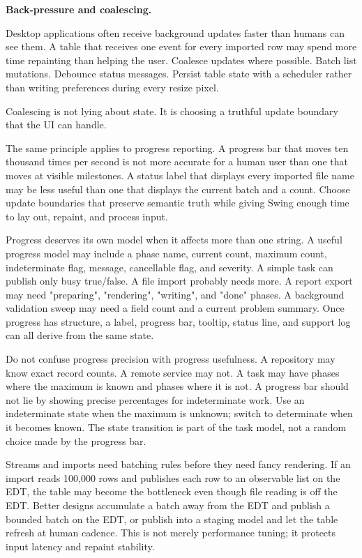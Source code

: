 \textbf{Back-pressure and coalescing.}

Desktop applications often receive background updates faster than humans can
see them. A table that receives one event for every imported row may spend more
time repainting than helping the user. Coalesce updates where possible. Batch
list mutations. Debounce status messages. Persist table state with a scheduler
rather than writing preferences during every resize pixel.

Coalescing is not lying about state. It is choosing a truthful update boundary
that the UI can handle.

The same principle applies to progress reporting. A progress bar that moves ten
thousand times per second is not more accurate for a human user than one that
moves at visible milestones. A status label that displays every imported file
name may be less useful than one that displays the current batch and a count.
Choose update boundaries that preserve semantic truth while giving Swing enough
time to lay out, repaint, and process input.

Progress deserves its own model when it affects more than one string. A useful
progress model may include a phase name, current count, maximum count,
indeterminate flag, message, cancellable flag, and severity. A simple task can
publish only busy true/false. A file import probably needs more. A report
export may need "preparing", "rendering", "writing", and "done" phases. A
background validation sweep may need a field count and a current problem
summary. Once progress has structure, a label, progress bar, tooltip, status
line, and support log can all derive from the same state.

Do not confuse progress precision with progress usefulness. A repository may
know exact record counts. A remote service may not. A task may have phases
where the maximum is known and phases where it is not. A progress bar should
not lie by showing precise percentages for indeterminate work. Use an
indeterminate state when the maximum is unknown; switch to determinate when it
becomes known. The state transition is part of the task model, not a random
choice made by the progress bar.

Streams and imports need batching rules before they need fancy rendering. If an
import reads 100,000 rows and publishes each row to an observable list on the
EDT, the table may become the bottleneck even though file reading is off the
EDT. Better designs accumulate a batch away from the EDT and publish a bounded
batch on the EDT, or publish into a staging model and let the table refresh at
human cadence. This is not merely performance tuning; it protects input
latency and repaint stability.

